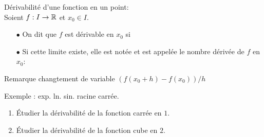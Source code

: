 \documentclass[a4paper, 11pt]{article}
\begin{document}
{\noindent

	\begin{defi} D\'erivabilit\'e d'une fonction en un point:\\
		\noindent Soient $f: I\rightarrow \mathbb{R}$ et $x_0\in I$. \vsec
		\begin{itemize}
			\item[$\bullet$] On dit que $f$ est d\'erivable en $x_0$ si \dotfill \vsec\\
			      \phantom{\hspace{0cm}} \dotfill \vsec
			\item[$\bullet$] Si cette limite existe, elle est not\'ee \dotfill et est appel\'ee le nombre d\'eriv\'ee de $f$ en $x_0$:\\
			      \vspace{1cm}
		\end{itemize}
	\end{defi}

	Remarque  changtement de variable $(f(x_0+h) -f(x_0))/h$
}

Exemple : exp. ln. sin. racine carrée.


{\footnotesize \begin{exercice}
	\begin{enumerate}
		\item \'Etudier la d\'erivabilit\'e de la fonction carr\'ee en $1$.
		\item \'Etudier la d\'erivabilit\'e de la fonction cube en $2$.
	\end{enumerate}
\end{exercice}}


\end{document}
